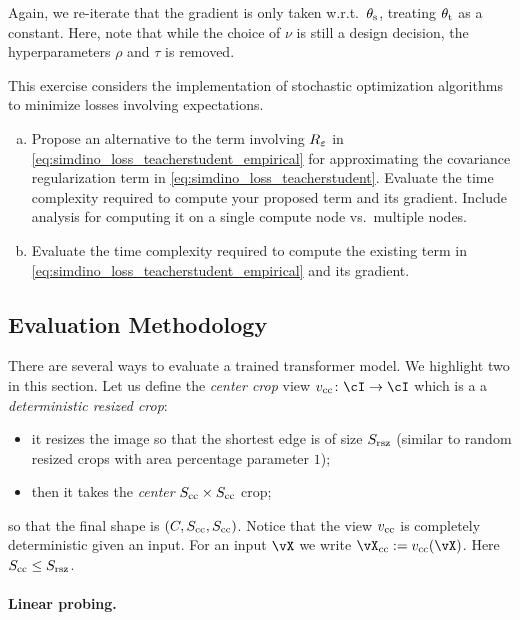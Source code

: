\documentclass[\toplevelprefix/book-main.tex]{subfiles}
\begin{document}
Again, we re-iterate that the gradient is only taken w.r.t.~\(\theta_{\mathrm{s}}\), treating \(\theta_{\mathrm{t}}\) as a constant. Here, note that while the choice of \(\nu\) is still a design decision, the hyperparameters \(\rho\) and \(\tau\) is removed.

\begin{exercise}
    This exercise considers the implementation of stochastic optimization algorithms to minimize losses involving expectations.
    \begin{enumerate}[(a)]
        \item Propose an alternative to the term involving \(R_{\varepsilon}\) in \eqref{eq:simdino_loss_teacherstudent_empirical} for approximating the covariance regularization term in \eqref{eq:simdino_loss_teacherstudent}. Evaluate the time complexity required to compute your proposed term and its gradient. Include analysis for computing it on a single compute node vs.~multiple nodes.
        \item  Evaluate the time complexity required to compute the existing term in \eqref{eq:simdino_loss_teacherstudent_empirical} and its gradient.
    \end{enumerate}
\end{exercise}


\subsection{Evaluation Methodology}\label{sub:contrastive_learning_evals}
There are several ways to evaluate a trained transformer model. We highlight two in this section. Let us define the \textit{center crop} view \(v_{\cc} \colon \cI \to \cI\) which is a a \textit{deterministic resized crop}:
\begin{itemize}
    \item it resizes the image so that the shortest edge is of size \(S_{\mathrm{rsz}}\) (similar to random resized crops with area percentage parameter \(1\));
    \item then it takes the \textit{center} \(S_{\mathrm{cc}} \times S_{\mathrm{cc}}\) crop;
\end{itemize}
so that the final shape is \((C, S_{\mathrm{cc}}, S_{\mathrm{cc}})\). Notice that the view \(v_{\mathrm{cc}}\) is completely deterministic given an input. For an input \(\vX\) we write \(\vX_{\cc} := v_{\cc}(\vX)\). Here \(S_{\mathrm{cc}} \leq S_{\mathrm{rsz}}\).


\paragraph{Linear probing.}
\end{document}
